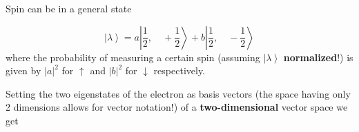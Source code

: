 
Spin can be in a general state

\begin{equation*}
    \left|\lambda\right>=a\left|\frac{1}{2},\quad +\frac{1}{2}\right>+b\left|\frac{1}{2},\quad -\frac{1}{2}\right>
\end{equation*}
where the probability of measuring a certain spin (assuming $\left|\lambda\right>$ \textbf{normalized}!) is given by $|a|^2$ for $\uparrow$ and $|b|^2$ for $\downarrow$ respectively.


Setting the two eigenstates of the electron as basis vectors (the space having only 2 dimensions allows for vector notation!) of a \textbf{two-dimensional} vector space we get

